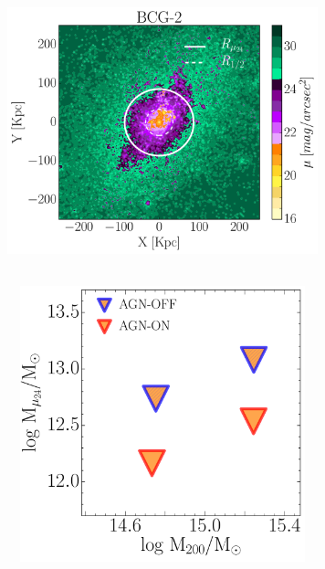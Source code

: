 \begin{figure}[H]
 \hspace*{-0.27cm}
 \includegraphics[height=8cm, width=9.0cm, trim={3.2cm 0cm 0cm 1.1cm},clip]{../al_final/LR/LR_minpot3_rmmax/nodust/grupo0/mu24/D2/091/maps_D2_aperturas.pdf}
\caption[csfagnmap]{}
\end{figure}



\begin{figure}[H]
 \centering
 \includegraphics[height=8cm, width=9cm]{../al_final/LR/evolucion/relaciones/csf_agn.pdf}
\end{figure}

